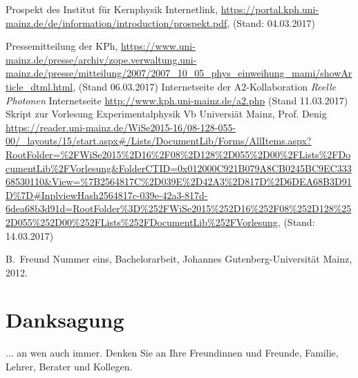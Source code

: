 \documentclass[a4paper,11pt,oneside,final,german,openbib,pdftex]{scrbook}
\begin{document}
\begin{appendix}
\begin{thebibliography}{99}
 Prospekt des Institut für Kernphysik Internetlink, \url{https://portal.kph.uni-mainz.de/de/information/introduction/prospekt.pdf}, (Stand: 04.03.2017)

 Pressemitteilung der KPh, \url{https://www.uni-mainz.de/presse/archiv/zope.verwaltung.uni-mainz.de/presse/mitteilung/2007/2007_10_05_phys_einweihung_mami/showArticle_dtml.html}, (Stand 06.03.2017)
 Internetseite der A2-Kollaboration {\em Reelle Photonen}
Internetseite \url{http://www.kph.uni-mainz.de/a2.php} (Stand 11.03.2017)
 Skript zur Vorlesung Experimentalphysik Vb Universi\"at Mainz, Prof. Denig \url{https://reader.uni-mainz.de/WiSe2015-16/08-128-055-00/_layouts/15/start.aspx#/Lists/DocumentLib/Forms/AllItems.aspx?RootFolder=%2FWiSe2015%2D16%2F08%2D128%2D055%2D00%2FLists%2FDocumentLib%2FVorlesung&FolderCTID=0x012000C921B079A8CB0245BC9EC33368530110&View=%7B2564817C%2D039E%2D42A3%2D817D%2D6DEA68B3D91D%7D#InplviewHash2564817c-039e-42a3-817d-6dea68b3d91d=RootFolder%3D%252FWiSe2015%252D16%252F08%252D128%252D055%252D00%252FLists%252FDocumentLib%252FVorlesung}, (Stand: 14.03.2017)










  B.~Freund Nummer eins, 
  Bachelorarbeit, Johannes Gutenberg-Universit\"at Mainz, 2012.

\end{thebibliography}

\chapter{Danksagung}

... an wen auch immer. Denken Sie an Ihre Freundinnen und Freunde, 
Familie, Lehrer, Berater und Kollegen.

\end{appendix}
\end{document}
